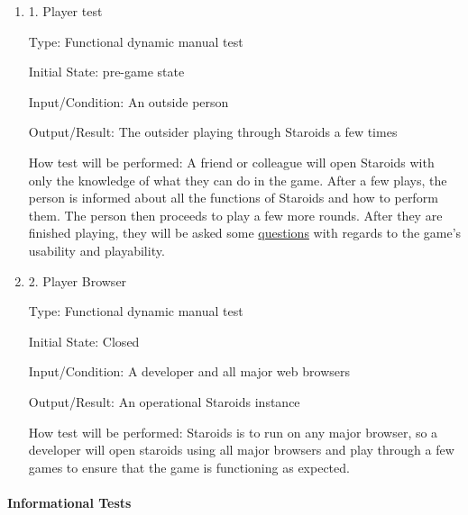 \documentclass[12pt, titlepage]{article}
\begin{document}
\begin{enumerate}

\item{1. Player test\\}

Type: Functional dynamic manual test

Initial State: pre-game state

Input/Condition: An outside person

Output/Result: The outsider playing through Staroids a few times

How test will be performed: A friend or colleague will open Staroids with only the knowledge of what they can do in the game. After a few plays, the person is informed about all the functions of Staroids and how to perform them. The person then proceeds to play a few more rounds. After they are finished playing, they will be asked some \hyperref[interview:questions]{questions} with regards to the game's usability and playability.

\item{2. Player Browser\\}

Type: Functional dynamic manual test

Initial State: Closed

Input/Condition: A developer and all major web browsers

Output/Result: An operational Staroids instance

How test will be performed: Staroids is to run on any major browser, so a developer will open staroids using all major browsers and play through a few games to ensure that the game is functioning as expected.

\end{enumerate}

\paragraph{Informational Tests}
\end{document}
